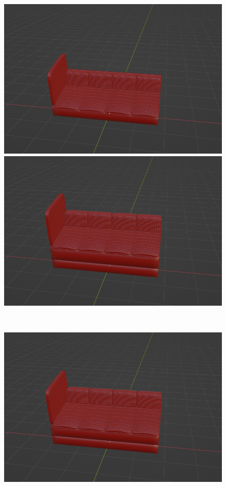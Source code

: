 \begin{figure}[h]
 \begin{minipage}[b]{0.48\linewidth}
  \centering
  \includegraphics[scale=0.17]{./imgs/sofaParamMean/Base2HeightMin.png}
 \end{minipage}
 \begin{minipage}[b]{0.48\linewidth}
  \centering
  \includegraphics[scale=0.17]{./imgs/sofaParamMean/Base2HeightMax.png}
 \end{minipage}\\
 \begin{minipage}[b]{0.48\linewidth}
  \centering
  \includegraphics[scale=0.17]{./imgs/sofaParamMean/backTickMin.png}

\end{minipage}
\end{figure}
